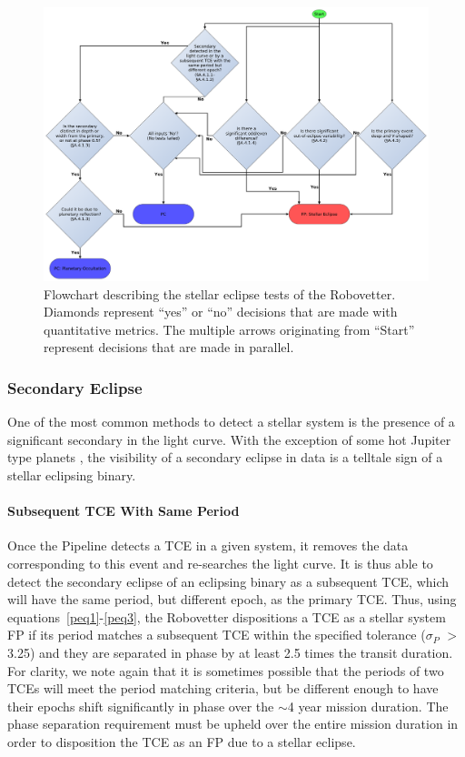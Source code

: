 \begin{figure}[ht]
\centering
\includegraphics[width=\linewidth]{RoboVetter-Diagram-V4-SigSec.pdf}
\caption{Flowchart describing the stellar eclipse tests of the Robovetter. Diamonds represent ``yes'' or ``no'' decisions that are made with quantitative metrics. The multiple arrows originating from ``Start'' represent decisions that are made in parallel.}
\label{robovetter-sigsec-fig}
\end{figure}


\subsubsection{Secondary Eclipse}

One of the most common methods to detect a stellar system is the presence of a significant secondary in the light curve. With the exception of some hot Jupiter type planets \citep[e.g., HAT-P-7,][]{Borucki2009}, the visibility of a secondary eclipse in \kepler{} data is a telltale sign of a stellar eclipsing binary.


\paragraph{Subsequent TCE With Same Period}
\label{s:secondTce}
Once the \kepler{} Pipeline detects a TCE in a given system, it removes the data corresponding to this event and re-searches the light curve. It is thus able to detect the secondary eclipse of an eclipsing binary as a subsequent TCE, which will have the same period, but different epoch, as the primary TCE. Thus, using equations~\ref{peq1}-\ref{peq3}, the Robovetter dispositions a TCE as a stellar system FP if its period matches a subsequent TCE within the specified tolerance ($\sigma_{P}$ $>$ 3.25) and they are separated in phase by at least 2.5 times the transit duration. For clarity, we note again that it is sometimes possible that the periods of two TCEs will meet the period matching criteria, but be different enough to have their epochs shift significantly in phase over the $\sim$4 year mission duration. The phase separation requirement must be upheld over the entire mission duration in order to disposition the TCE as an FP due to a stellar eclipse.  


